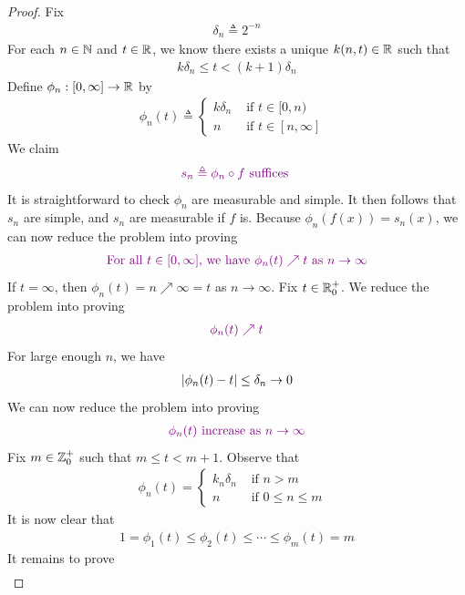 \documentclass{report}
\begin{document}
\begin{proof}
Fix 
\begin{align*}
\delta_n \triangleq 2^{-n}
\end{align*}
For each $n\in\mathbb{N}$ and $t\in\mathbb{R}$, we know there exists a unique $k(n,t)\in\mathbb{R}$ such that 
\begin{align*}
k\delta_n \leq t < (k+1)\delta_n
\end{align*}
Define $\phi_n: [0,\infty]\rightarrow \mathbb{R}$ by 
\begin{align*}
\phi_n(t)\triangleq \begin{cases}
 k\delta_n & \text{ if $t \in [0,n)$ } \\
 n& \text{ if $t\in [n,\infty]$ }
\end{cases}
\end{align*}
We claim 
\begin{align*}
\textcolor{violet}{s_n\triangleq \phi_n\circ f\text{ suffices }}
\end{align*}
It is straightforward to check $\phi_n$ are measurable and simple. It then follows that $s_n$ are simple, and $s_n$ are measurable if  $f$ is. Because $\phi_n (f(x))=s_n(x)$, we can now reduce the problem into proving 
\begin{align*}
\textcolor{violet}{\text{ For all $t \in [0,\infty]$, we have }\phi_n(t)\nearrow t\text{ as $n\to \infty$ }}
\end{align*}
If $t=\infty$, then $\phi_n(t)=n\nearrow \infty=t$ as $n\to \infty$. Fix $t\in\mathbb{R}_0^+$. We reduce the problem into proving 
\begin{align*}
  \textcolor{violet}{\phi_n(t)\nearrow t}
\end{align*}
For large enough $n$, we have
\begin{align*}
\left|\phi_n(t)-t\right|\leq \delta_n \to 0
\end{align*}
We can now reduce the problem into proving 
\begin{align*}
\textcolor{violet}{\phi_n(t)\text{ increase as }n\to \infty}
\end{align*}
Fix $m \in\mathbb{Z}_0^+$ such that  $m\leq t< m+1$. Observe that 
\begin{align*}
\phi_n(t)=\begin{cases}
  k_n \delta_n & \text{ if $n>m$ }\\
  n& \text{ if $0\leq n\leq m$ }
\end{cases}
\end{align*}
It is now clear that 
\begin{align*}
1=\phi_1(t)\leq \phi_2(t)\leq \cdots \leq \phi_m(t)=m
\end{align*}
It remains to prove 
\begin{align*}

\end{align*}
\end{proof}
\end{document}
